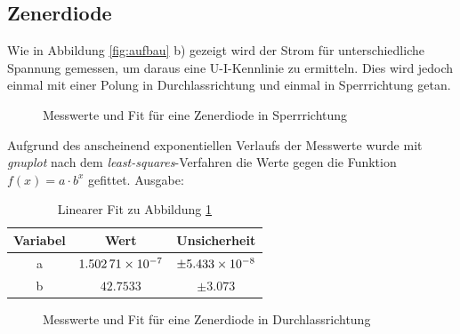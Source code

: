 \subsection{Zenerdiode}
Wie in Abbildung \ref{fig:aufbau} b) gezeigt wird der Strom für unterschiedliche Spannung gemessen, um daraus eine U-I-Kennlinie zu ermitteln. Dies wird jedoch einmal mit einer Polung in Durchlassrichtung und einmal in Sperrrichtung getan.
\begin{figure}[H]
\centering
{}
\caption{Messwerte und Fit für eine Zenerdiode in Sperrrichtung}
\label{fig:diodesperr}
\end{figure}
Aufgrund des anscheinend exponentiellen Verlaufs der Messwerte wurde mit \emph{gnuplot} nach dem \emph{least-squares}-Verfahren die Werte gegen die Funktion $f(x)=a\cdot b^x$ gefittet. Ausgabe:
\begin{table}[H]
  \centering
  \begin{tabular}{c | c | c }
    Variabel   & Wert & Unsicherheit\\ \hline
    a & $\num{1.50271d-7}$ & $\pm\num{5.433d-8}$ \\
    b & $\num{42.7533}$ & $\pm\num{3.073}$
  \end{tabular}
  \caption{Linearer Fit zu Abbildung \ref{fig:diodesperr}}
  \label{tab:fitdiodesperr}
\end{table}
\begin{figure}[H]
\centering
{}
\caption{Messwerte und Fit für eine Zenerdiode in Durchlassrichtung}
\label{fig:diodedurch}
\end{figure}
